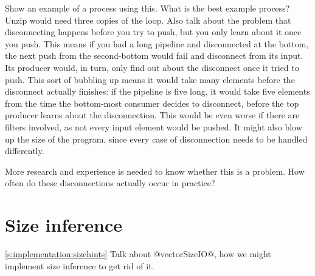 Show an example of a process using this. What is the best example process? Unzip would need three copies of the loop.
Also talk about the problem that disconnecting happens before you try to push, but you only learn about it once you push.
This means if you had a long pipeline and disconnected at the bottom, the next push from the second-bottom would fail and disconnect from its input.
Its producer would, in turn, only find out about the disconnect once it tried to push.
This sort of bubbling up means it would take many elements before the disconnect actually finishes: if the pipeline is five long, it would take five elements from the time the bottom-most consumer decides to disconnect, before the top producer learns about the disconnection.
This would be even worse if there are filters involved, as not every input element would be pushed.
It might also blow up the size of the program, since every case of disconnection needs to be handled differently.

More research and experience is needed to know whether this is a problem.
How often do these disconnections actually occur in practice?

\section{Size inference}
\label{s:Future:SizeInference}
\autoref{s:implementation:sizehints}
Talk about @vectorSizeIO@, how we might implement size inference to get rid of it.

